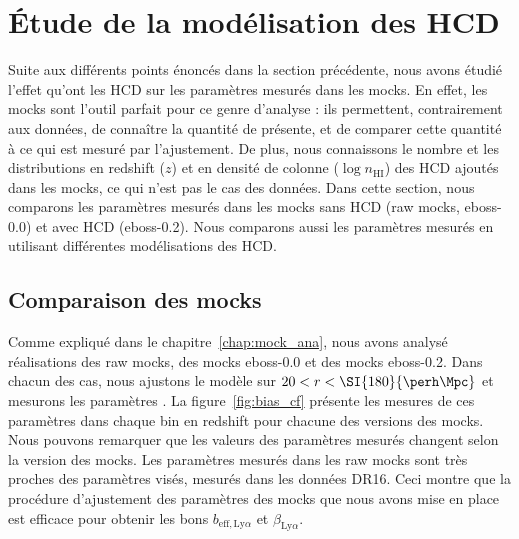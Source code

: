 \section{Étude de la modélisation des HCD}
\label{sec:etude_model_hcd}
Suite aux différents points énoncés dans la section précédente, nous avons étudié l'effet qu'ont les HCD sur les paramètres \lya{} mesurés dans les mocks.
En effet, les mocks sont l'outil parfait pour ce genre d'analyse : ils permettent, contrairement aux données, de connaître la quantité de \lya{} présente, et de comparer cette quantité à ce qui est mesuré par l'ajustement. De plus, nous connaissons le nombre et les distributions en redshift ($z$) et en densité de colonne ($\log n_{\mathrm{HI}}$) des HCD ajoutés dans les mocks, ce qui n'est pas le cas des données.
Dans cette section, nous comparons les paramètres \lya{} mesurés dans les mocks sans HCD (raw mocks, eboss-0.0) et avec HCD (eboss-0.2). Nous comparons aussi les paramètres \lya{} mesurés en utilisant différentes modélisations des HCD.

\subsection{Comparaison des mocks}
\label{subsec:comparaison_mocks}
Comme expliqué dans le chapitre~\ref{chap:mock_ana}, nous avons analysé \Nmocks{} réalisations des raw mocks, des mocks eboss-0.0 et des mocks eboss-0.2.
Dans chacun des cas, nous ajustons le modèle sur $20 < r < \SI{180}{\perh\Mpc}$ et mesurons les paramètres \lya{}.
La figure~\ref{fig:bias_cf} présente les mesures de ces paramètres dans chaque bin en redshift pour chacune des versions des mocks.
Nous pouvons remarquer que les valeurs des paramètres \lya{} mesurés changent selon la version des mocks.
Les paramètres mesurés dans les raw mocks sont très proches des paramètres visés, mesurés dans les données DR16. Ceci montre que la procédure d'ajustement des paramètres des mocks que nous avons mise en place est efficace pour obtenir les bons $b_{\mathrm{eff},\mathrm{Ly}\alpha}$ et $\beta_{\mathrm{Ly}\alpha}$.

